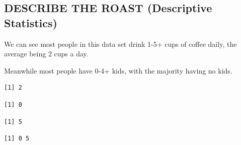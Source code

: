 \documentclass[
  letterpaper,
  DIV=11,
  numbers=noendperiod]{scrartcl}
\newenvironment{Shaded}{\begin{snugshade}}{\end{snugshade}}
\newcommand{\CommentTok}[1]{\textcolor[rgb]{0.37,0.37,0.37}{#1}}
\newcommand{\FunctionTok}[1]{\textcolor[rgb]{0.28,0.35,0.67}{#1}}
\newcommand{\NormalTok}[1]{\textcolor[rgb]{0.00,0.23,0.31}{#1}}
\newcommand{\SpecialCharTok}[1]{\textcolor[rgb]{0.37,0.37,0.37}{#1}}
\begin{document}
\subsection{DESCRIBE THE ROAST (Descriptive
Statistics)}\label{describe-the-roast-descriptive-statistics}

We can see most people in this data set drink 1-5+ cups of coffee daily,
the average being 2 cups a day.

Meanwhile most people have 0-4+ kids, with the majority having no kids.

\begin{Shaded}
\end{Shaded}

\begin{verbatim}
[1] 2
\end{verbatim}

\begin{Shaded}
\end{Shaded}

\begin{verbatim}
[1] 0
\end{verbatim}

\begin{Shaded}
\end{Shaded}

\begin{verbatim}
[1] 5
\end{verbatim}

\begin{Shaded}
\end{Shaded}

\begin{verbatim}
[1] 0 5
\end{verbatim}
\end{document}
